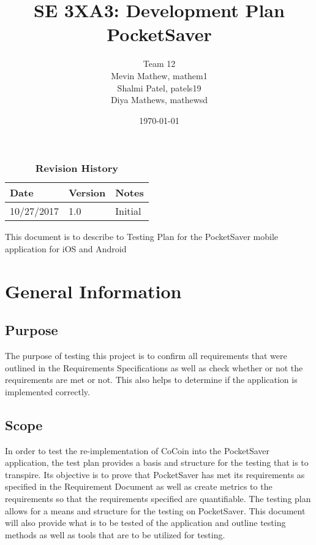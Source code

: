 \documentclass[12pt, titlepage]{article}
\title{SE 3XA3: Development Plan\\PocketSaver}
\author{Team 12
		\\ Mevin Mathew, mathem1
		\\ Shalmi Patel, patels19
		\\ Diya Mathews, mathewsd
}
\date{\today}
\begin{document}
\maketitle

\tableofcontents
\listoftables
\listoffigures

\begin{table}[bp]
\caption{\bf Revision History}
\begin{tabularx}{\textwidth}{p{3cm}p{2cm}X}
\toprule {\bf Date} & {\bf Version} & {\bf Notes}\\
\midrule
10/27/2017 & 1.0 & Initial\\

\bottomrule
\end{tabularx}
\end{table}

\newpage


This document is to describe to Testing Plan for the PocketSaver mobile application for iOS and Android

\section{General Information}

\subsection{Purpose}
The purpose of testing this project is to confirm all requirements that were outlined in the Requirements Specifications as well as check whether or not the requirements are met or not. This also helps to determine if the application is implemented correctly.

\subsection{Scope}
In order to test the re-implementation of CoCoin into the PocketSaver application, the test plan provides a basis and structure for the testing that is to transpire. Its objective is to prove that PocketSaver has met its requirements as specified in the Requirement Document as well as create metrics to the requirements so that the requirements specified are quantifiable. The testing plan allows for a means and structure for the testing on PocketSaver. This document will also provide what is to be tested of the application and outline testing methods as well as tools that are to be utilized for testing.
\end{document}
